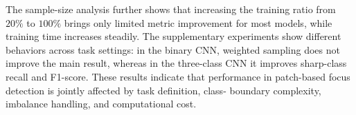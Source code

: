 \par The sample-size analysis further shows that increasing the training ratio
from $20\%$ to $100\%$ brings only limited metric improvement for most models,
while training time increases steadily. The supplementary experiments show
different behaviors across task settings: in the binary CNN, weighted sampling
does not improve the main result, whereas in the three-class CNN it improves
sharp-class recall and F1-score. These results indicate that performance in
patch-based focus detection is jointly affected by task definition, class-
boundary complexity, imbalance handling, and computational cost.
